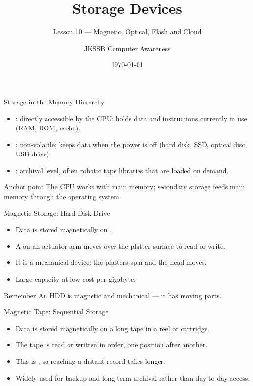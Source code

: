 \documentclass[aspectratio=169]{beamer}
\title{Storage Devices}
\subtitle{Lesson 10 --- Magnetic, Optical, Flash and Cloud}
\author{JKSSB Computer Awareness}
\date{\today}
\begin{document}
\frame{\titlepage}

\begin{frame}{Storage in the Memory Hierarchy}
  \begin{itemize}
    \item {}: directly accessible by the CPU; holds data
      and instructions currently in use (RAM, ROM, cache).
    \item {}: non-volatile; keeps data when the power is
      off (hard disk, SSD, optical disc, USB drive).
    \item {}: archival level, often robotic tape
      libraries that are loaded on demand.
  \end{itemize}
  \begin{block}{Anchor point}
    The CPU works with main memory; secondary storage feeds main memory
    through the operating system.
  \end{block}
\end{frame}

\begin{frame}{Magnetic Storage: Hard Disk Drive}
  \begin{itemize}
    \item Data is stored magnetically on .
    \item A  on an actuator arm moves over the platter
      surface to read or write.
    \item It is a mechanical device: the platters spin and the head moves.
    \item Large capacity at low cost per gigabyte.
  \end{itemize}
  \begin{alertblock}{Remember}
    An HDD is magnetic and mechanical --- it has moving parts.
  \end{alertblock}
\end{frame}

\begin{frame}{Magnetic Tape: Sequential Storage}
  \begin{itemize}
    \item Data is stored magnetically on a long tape in a reel or cartridge.
    \item The tape is read or written in order, one position after another.
    \item This is , so reaching a distant record takes
      longer.
    \item Widely used for backup and long-term archival rather than
      day-to-day access.
  \end{itemize}
  \vspace{0.3cm}
\end{frame}
\end{document}
